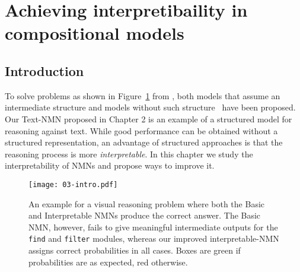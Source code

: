 \documentclass[main.tex]{subfiles}
\begin{document}
\section{Achieving interpretibaility in compositional models} %
\label{sec:nmn-interpret}

\subsection{Introduction}

To solve problems as shown in Figure~\ref{fig:03-intro} from \nlvr{}, both models that assume an intermediate structure \cite{nmn-2016,jiang-nmn-2019} and models without such structure~\cite{lxmert-hao-2019,mtmsn-2019,compositional-min-2019} have been proposed. Our Text-NMN proposed in Chapter 2 is an example of a structured model for reasoning against text.
While good performance can be obtained without a structured representation, an advantage of structured approaches is that the reasoning process is more \emph{interpretable}. In this chapter we study the interpretability of NMNs and propose ways to improve it.


%
\begin{figure}[bh!]
    \centering
    \texttt{[image: 03-intro.pdf]}
    \caption{An example for a visual reasoning problem where both the Basic and Interpretable NMNs produce the correct answer.
    The Basic NMN, however, fails to give meaningful intermediate outputs for the \texttt{find} and \texttt{filter} modules, whereas our improved interpretable-NMN assigns correct probabilities in all cases. Boxes are green if probabilities are as expected, red otherwise.}
    \label{fig:03-intro}
\end{figure}
\end{document}
